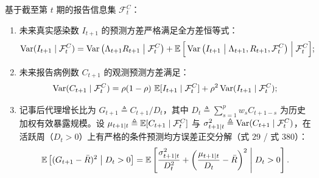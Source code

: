 \begin{proposition}\label{prop:prop6}
基于截至第 $t$ 期的报告信息集 $\mathcal{F}_t^C$：
\begin{enumerate}[label=(\roman*)]
    \item 未来真实感染数 $I_{t+1}$ 的预测方差严格满足全方差恒等式：
    \begin{equation}
    \operatorname{Var}(I_{t+1} \mid \mathcal{F}_t^C) = \operatorname{Var}\big( \Lambda_{t+1} R_{t+1} \;\big|\; \mathcal{F}_t^C \big) + \operatorname{\mathbb{E}}\Big[ \operatorname{Var}\big( I_{t+1} \;\big|\; \Lambda_{t+1}, R_{t+1}, \mathcal{F}_t^C \big) \;\Big|\; \mathcal{F}_t^C \Big]; \label{eq:var_I_decomp}
    \end{equation}
    \item 未来报告病例数 $C_{t+1}$ 的观测预测方差满足：
    \begin{equation}
    \operatorname{Var}(C_{t+1} \mid \mathcal{F}_t^C) = \rho(1 - \rho)\,\operatorname{\mathbb{E}}[I_{t+1} \mid \mathcal{F}_t^C] + \rho^2 \operatorname{Var}(I_{t+1} \mid \mathcal{F}_t^C); \label{eq:var_C_decomp}
    \end{equation}
    \item 记事后代理增长比为 $G_{t+1} \triangleq C_{t+1} / D_t$，其中 $D_t \triangleq \sum_{s=1}^p w_s C_{t+1-s}$ 为历史加权有效暴露规模。设 $\mu_{t+1 \mid t} \triangleq \operatorname{\mathbb{E}}[C_{t+1} \mid \mathcal{F}_t^C]$ 与 $\sigma_{t+1 \mid t}^2 \triangleq \operatorname{Var}(C_{t+1} \mid \mathcal{F}_t^C)$，在活跃周（$D_t > 0$）上有严格的条件预测均方误差正交分解（式 29 / 式 380）：
    \begin{equation}
    \operatorname{\mathbb{E}}\left[ (G_{t+1} - \bar{R})^2 \;\middle|\; D_t > 0 \right] = \operatorname{\mathbb{E}}\left[ \frac{\sigma_{t+1 \mid t}^2}{D_t^2} + \left( \frac{\mu_{t+1 \mid t}}{D_t} - \bar{R} \right)^2 \;\middle|\; D_t > 0 \right]. \label{eq:exact_renewal_decomp}
    \end{equation}
\end{enumerate}
\end{proposition}

